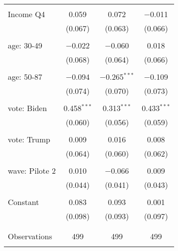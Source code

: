 \begin{tabular}{@{\extracolsep{5pt}}lccc}
  & & & \\ 
 Income Q4 & 0.059 & 0.072 & $-$0.011 \\ 
  & (0.067) & (0.063) & (0.066) \\ 
  & & & \\ 
 age: 30-49 & $-$0.022 & $-$0.060 & 0.018 \\ 
  & (0.068) & (0.064) & (0.066) \\ 
  & & & \\ 
 age: 50-87 & $-$0.094 & $-$0.265$^{***}$ & $-$0.109 \\ 
  & (0.074) & (0.070) & (0.073) \\ 
  & & & \\ 
 vote: Biden & 0.458$^{***}$ & 0.313$^{***}$ & 0.433$^{***}$ \\ 
  & (0.060) & (0.056) & (0.059) \\ 
  & & & \\ 
 vote: Trump & 0.009 & 0.016 & 0.008 \\ 
  & (0.064) & (0.060) & (0.062) \\ 
  & & & \\ 
 wave: Pilote 2 & 0.010 & $-$0.066 & 0.009 \\ 
  & (0.044) & (0.041) & (0.043) \\ 
  & & & \\ 
 Constant & 0.083 & 0.093 & 0.001 \\ 
  & (0.098) & (0.093) & (0.097) \\ 
  & & & \\ 
\hline \\[-1.8ex] 

Observations & 499 & 499 & 499 \\ 
\hline 
\hline \\[-1.8ex] 
\end{tabular} 